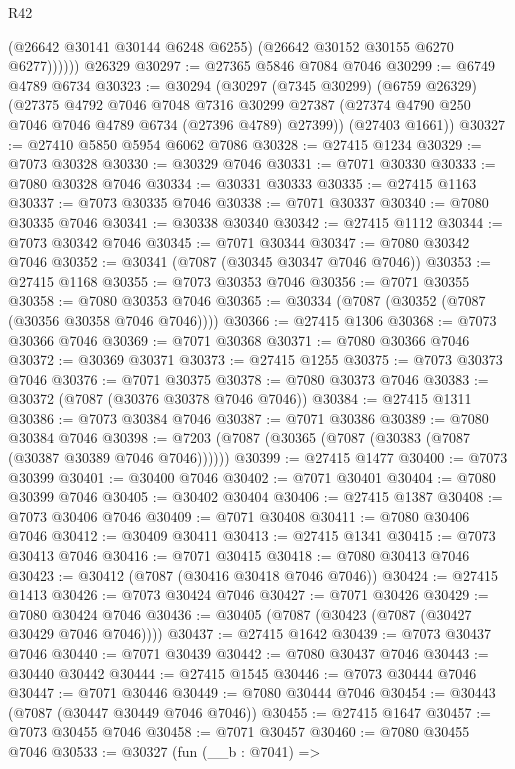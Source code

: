 \begin{lexlean}{R42}
\begin{coremodule}
{              (@26642 @30141 @30144 @6248 @6255)
              (@26642 @30152 @30155 @6270 @6277))))))
    @26329
@30297 := @27365 @5846 @7084 @7046
@30299 := @6749 @4789 @6734
@30323 := @30294
    (@30297
      (@7345 @30299)
      (@6759 @26329)
      (@27375
        @4792
        @7046
        @7048
        @7316
        @30299
        @27387
        (@27374 @4790 @250 @7046 @7046 @4789 @6734 (@27396 @4789) @27399))
      (@27403 @1661))
@30327 := @27410 @5850 @5954 @6062 @7086
@30328 := @27415 @1234
@30329 := @7073 @30328
@30330 := @30329 @7046
@30331 := @7071 @30330
@30333 := @7080 @30328 @7046
@30334 := @30331 @30333
@30335 := @27415 @1163
@30337 := @7073 @30335 @7046
@30338 := @7071 @30337
@30340 := @7080 @30335 @7046
@30341 := @30338 @30340
@30342 := @27415 @1112
@30344 := @7073 @30342 @7046
@30345 := @7071 @30344
@30347 := @7080 @30342 @7046
@30352 := @30341 (@7087 (@30345 @30347 @7046 @7046))
@30353 := @27415 @1168
@30355 := @7073 @30353 @7046
@30356 := @7071 @30355
@30358 := @7080 @30353 @7046
@30365 := @30334 (@7087 (@30352 (@7087 (@30356 @30358 @7046 @7046))))
@30366 := @27415 @1306
@30368 := @7073 @30366 @7046
@30369 := @7071 @30368
@30371 := @7080 @30366 @7046
@30372 := @30369 @30371
@30373 := @27415 @1255
@30375 := @7073 @30373 @7046
@30376 := @7071 @30375
@30378 := @7080 @30373 @7046
@30383 := @30372 (@7087 (@30376 @30378 @7046 @7046))
@30384 := @27415 @1311
@30386 := @7073 @30384 @7046
@30387 := @7071 @30386
@30389 := @7080 @30384 @7046
@30398 := @7203 (@7087 (@30365 (@7087 (@30383 (@7087 (@30387 @30389 @7046 @7046))))))
@30399 := @27415 @1477
@30400 := @7073 @30399
@30401 := @30400 @7046
@30402 := @7071 @30401
@30404 := @7080 @30399 @7046
@30405 := @30402 @30404
@30406 := @27415 @1387
@30408 := @7073 @30406 @7046
@30409 := @7071 @30408
@30411 := @7080 @30406 @7046
@30412 := @30409 @30411
@30413 := @27415 @1341
@30415 := @7073 @30413 @7046
@30416 := @7071 @30415
@30418 := @7080 @30413 @7046
@30423 := @30412 (@7087 (@30416 @30418 @7046 @7046))
@30424 := @27415 @1413
@30426 := @7073 @30424 @7046
@30427 := @7071 @30426
@30429 := @7080 @30424 @7046
@30436 := @30405 (@7087 (@30423 (@7087 (@30427 @30429 @7046 @7046))))
@30437 := @27415 @1642
@30439 := @7073 @30437 @7046
@30440 := @7071 @30439
@30442 := @7080 @30437 @7046
@30443 := @30440 @30442
@30444 := @27415 @1545
@30446 := @7073 @30444 @7046
@30447 := @7071 @30446
@30449 := @7080 @30444 @7046
@30454 := @30443 (@7087 (@30447 @30449 @7046 @7046))
@30455 := @27415 @1647
@30457 := @7073 @30455 @7046
@30458 := @7071 @30457
@30460 := @7080 @30455 @7046
@30533 := @30327
    (fun (__b : @7041) =>
}
\end{coremodule}
\end{lexlean}
